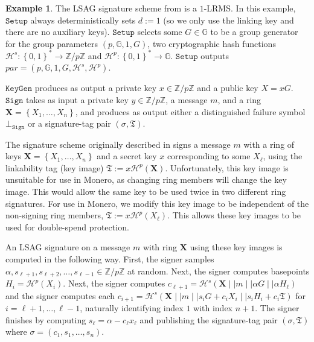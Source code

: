 \documentclass{mrl}
\theoremstyle{plain}
\theoremstyle{definition}
\newtheorem{example}{Example}[section]
\begin{document}
\begin{example}\label{ex:lsag}
The LSAG signature scheme from \cite{liu2004linkable} is a $1$-LRMS. In this example, $\texttt{Setup}$ always deterministically sets $d:=1$ (so we only use the linking key and there are no auxiliary keys). $\texttt{Setup}$ selects some $G \in \mathbb{G}$ to be a group generator for the group parameters $(p, \mathbb{G}, 1, G)$, two cryptographic hash functions $\mathcal{H}^s:\left\{0,1\right\}^* \to \mathbb{Z}/p\mathbb{Z}$ and $\mathcal{H}^p:\left\{0,1\right\}^* \to \mathbb{G}$. $\texttt{Setup}$ outputs $\textit{par} = (p, \mathbb{G}, 1, G, \mathcal{H}^s, \mathcal{H}^p)$.

$\texttt{KeyGen}$ produces as output a private key $x \in \mathbb{Z}/p\mathbb{Z}$ and a public key $X = xG$. $\texttt{Sign}$ takes as input a private key $y \in \mathbb{Z}/p\mathbb{Z}$, a message $m$, and a ring $\textbf{X} = \left\{X_1, \ldots, X_n\right\}$, and produces as output either a distinguished failure symbol $\bot_{\texttt{Sign}}$ or a signature-tag pair $(\sigma, \mathfrak{T})$.  

The signature scheme originally described in \cite{liu2004linkable} signs a message $m$ with a ring of keys $\textbf{X} = \left\{X_1, \ldots, X_n\right\}$ and a secret key $x$ corresponding to some $X_\ell$, using the linkability tag (key image) $\mathfrak{T} := x \mathcal{H}^p(\textbf{X})$. Unfortunately, this key image is unsuitable for use in Monero, as changing ring members will change the key image. This would allow the same key to be used twice in two different ring signatures. For use in Monero, we modify this key image to be independent of the non-signing ring members, $\mathfrak{T} := x \mathcal{H}^p(X_\ell)$. This allows these key images to be used for double-spend protection.

An LSAG signature on a message $m$ with ring $\textbf{X}$ using these key images is computed in the following way. First, the signer samples $\alpha, s_{\ell+1}, s_{\ell+2}, \ldots, s_{\ell-1} \in \mathbb{Z}/p\mathbb{Z}$ at random. Next, the signer computes basepoints $H_i = \mathcal{H}^p(X_i)$. Next, the signer computes $c_{\ell+1}  = \mathcal{H}^s(\textbf{X} \mid \mid m \mid \mid \alpha G \mid \mid \alpha H_\ell)$ and the signer computes each $c_{i+1} = \mathcal{H}^s(\textbf{X} \mid \mid m \mid \mid s_i G + c_i X_i \mid \mid s_i H_i + c_i \mathfrak{T})$ for $i = \ell+1, \ldots, \ell-1$, naturally identifying index $1$ with index $n+1$. The signer finishes by computing $s_\ell = \alpha - c_\ell x_\ell$ and publishing the signature-tag pair $(\sigma, \mathfrak{T})$ where $\sigma = (c_1, s_1, \ldots, s_n)$.


\end{example}
\end{document}
